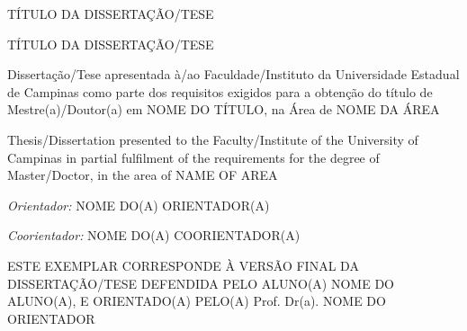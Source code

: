 \begin{center}
TÍTULO DA DISSERTAÇÃO/TESE

\vspace*{1\baselineskip}

TÍTULO DA DISSERTAÇÃO/TESE
\end{center}

\vspace{\fill} 

\begin{flushright}
\begin{minipage}{0.45\textwidth}
\begin{flushleft}
Dissertação/Tese apresentada à/ao Faculdade/Instituto da Universidade Estadual de Campinas como parte dos requisitos exigidos para a obtenção do título de Mestre(a)/Doutor(a) em NOME DO TÍTULO, na Área de NOME DA ÁREA

\vspace*{1\baselineskip}

Thesis/Dissertation presented to the Faculty/Institute of the University of Campinas in partial fulfilment of the requirements for the degree of Master/Doctor, in the area of NAME OF AREA
\end{flushleft}
\end{minipage}
\end{flushright}

\vspace{\fill} 

\begin{flushleft}
\textit{Orientador:} NOME DO(A) ORIENTADOR(A)

\textit{Coorientador:} NOME DO(A) COORIENTADOR(A)
\end{flushleft}

\vspace{\fill} 

\begin{flushleft}
\begin{minipage}{0.45\textwidth}
{\small
ESTE EXEMPLAR CORRESPONDE À VERSÃO FINAL DA DISSERTAÇÃO/TESE DEFENDIDA PELO ALUNO(A) NOME DO ALUNO(A), E ORIENTADO(A) PELO(A) Prof. Dr(a). NOME DO ORIENTADOR
}
\end{minipage}
\end{flushleft}

